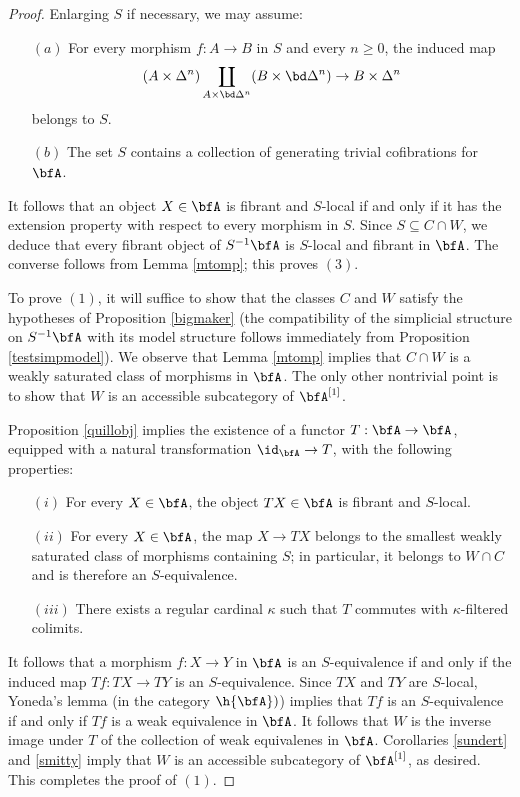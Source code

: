 \begin{Simplicial Categories}
\begin{proof}
Enlarging $S$ if necessary, we may assume:
\begin{itemize}
\item[$(a)$] For every morphism $f: A \rightarrow B$ in $S$ and every $n \geq 0$, the induced map
$$(A \times \Delta^n) \coprod_{ A \times \bd \Delta^n } (B \times \bd \Delta^n)
\rightarrow B \times \Delta^n$$ belongs to $S$.  
\item[$(b)$] The set $S$ contains a collection of generating trivial cofibrations for $\bfA$.
\end{itemize}
It follows that an object $X \in \bfA$ is fibrant and $S$-local if and only if it has the extension property with respect to every morphism in $S$. Since $S \subseteq C \cap W$, we deduce that every fibrant object of $S^{-1} \bfA$ is $S$-local and fibrant in $\bfA$. The converse follows from Lemma \ref{mtomp}; this proves $(3)$. 

To prove $(1)$, it will suffice to show that the classes $C$ and $W$ satisfy the hypotheses of Proposition \ref{bigmaker} (the compatibility of the simplicial structure on $S^{-1} \bfA$ with its model structure
follows immediately from Proposition \ref{testsimpmodel}). We observe that Lemma \ref{mtomp} implies that $C \cap W$ is a weakly saturated class of morphisms in $\bfA$. The only other nontrivial point is to show that $W$ is an accessible subcategory of $\bfA^{[1]}$.

Proposition \ref{quillobj} implies the existence of a functor $T: \bfA \rightarrow \bfA$, equipped with a natural transformation $\id_{\bfA} \rightarrow T$, with the following properties:
\begin{itemize}
\item[$(i)$] For every $X \in \bfA$, the object $TX \in \bfA$ is fibrant and $S$-local.
\item[$(ii)$] For every $X \in \bfA$, the map $X \rightarrow TX$ belongs to the smallest weakly saturated class of morphisms containing $S$; in particular, it belongs to $W \cap C$ and is therefore an $S$-equivalence.
\item[$(iii)$] There exists a regular cardinal $\kappa$ such that $T$ commutes with $\kappa$-filtered colimits.
\end{itemize}

It follows that a morphism $f: X \rightarrow Y$ in $\bfA$ is an $S$-equivalence if and only if the induced map $Tf: TX \rightarrow TY$ is an $S$-equivalence. Since $TX$ and $TY$ are $S$-local, Yoneda's lemma (in the category $\h{\bfA})$) implies that $Tf$ is an $S$-equivalence if and only if
$Tf$ is a weak equivalence in $\bfA$. It follows that $W$ is the inverse image under $T$ of the collection of weak equivalenes in $\bfA$. Corollaries \ref{sundert} and \ref{smitty} imply that $W$ is an accessible subcategory of $\bfA^{[1]}$, as desired. This completes the proof of $(1)$.


\end{proof}
\end{Simplicial Categories}
